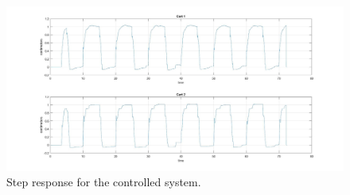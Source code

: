 \begin{figure}[h]
	\centering
	\includegraphics[width=0.9\linewidth]{img/hinf_response}
	\caption{Step response for the controlled system.}
	\label{fig:hinfnocurr}
\end{figure}


